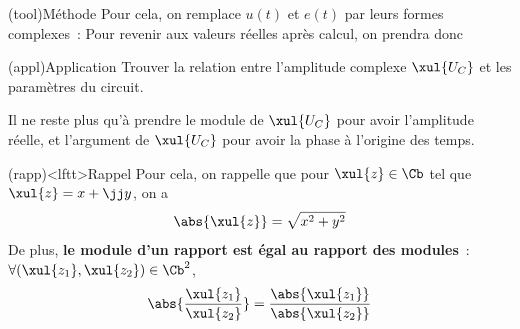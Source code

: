 \documentclass[../../main/main.tex]{subfiles}
\begin{document}
\begin{tcb}(tool){Méthode}
	Pour cela, on remplace $u(t)$ et $e(t)$ par leurs formes complexes~:
	Pour revenir aux valeurs réelles après calcul, on prendra donc
\end{tcb}

\begin{tcb}(appl){Application}
	Trouver la relation entre l'amplitude complexe $\xul{U_C}$ et les paramètres
	du circuit.
	\tcblower
	\begin{isd}[lefthand ratio=.3]
		\tcblower
	\end{isd}
\end{tcb}
Il ne reste plus qu'à prendre le module de $\xul{U_C}$ pour avoir l'amplitude
réelle, et l'argument de $\xul{U_C}$ pour avoir la phase à l'origine des
temps.
\begin{tcb}[sidebyside](rapp)<lftt>{Rappel}
	Pour cela, on rappelle que pour $\xul{z} \in \Cb$ tel que $\xul{z} = x + \jj
		y$, on a
	\[ \abs{\xul{z}} = \sqrt{x^2 + y^2}\]
	\tcblower
	De plus, \textbf{le module d'un rapport est égal au rapport des modules}~:
	$\forall (\xul{z_1}, \xul{z_2}) \in \Cb^2$,
	\[
		\abs{\frac{\xul{z_1}}{\xul{z_2}}} =
		\frac{\abs{\xul{z_1}}}{\abs{\xul{z_2}}}
	\]
\end{tcb}
\end{document}
